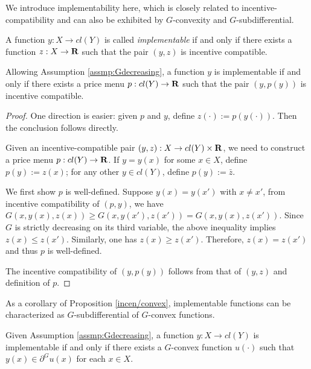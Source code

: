 {We introduce implementability here, which is closely related to incentive-compatibility and can also be exhibited by $G$-convexity and $G$-subdifferential. %
	
\begin{definition}[implementability]
		A function $y: X \rightarrow cl(Y)$ is called \textit{implementable} if and only if there exists a function $z: X \rightarrow {\mathbf R}$  such that the pair $(y, z)$ is incentive compatible.
\end{definition}

\begin{remark}\label{rmk:implementability}
	Allowing Assumption \ref{assmp:Gdecreasing}, a function $y$ is implementable if and only if there exists a price menu $p: cl(Y) \rightarrow {\mathbf R}$ such that the pair $(y, p(y))$ is incentive compatible.
\end{remark}

\begin{proof}%
	One direction is easier: given $p$ and $y$, define $z(\cdot):= p(y(\cdot))$. Then the conclusion follows directly.
	
	Given an incentive-compatible pair $(y, z): X \rightarrow cl(Y) \times {\mathbf R}$, we need to construct a price menu $p: cl(Y)\rightarrow {\mathbf R}$. If $y= y(x)$ for some $x\in X$, define $p(y):= z(x)$; for any other $y \in cl(Y)$, define $p(y) := \bar{z}$. \medskip
	
	We first show $p$ is well-defined. Suppose $y(x) = y(x')$ with $x\ne x'$, from incentive compatibility of $(p,y)$, we have $G(x,y(x), z(x)) \ge G(x, y(x'), z(x')) = G(x, y(x), z(x'))$. Since $G$ is strictly decreasing on its third variable, the above inequality implies $z(x) \le z(x')$. Similarly, one has $z(x) \ge z(x')$. Therefore, $z(x) = z(x')$ and thus $p$ is well-defined.
	
	The incentive compatibility of $(y, p(y))$ follows from that of $(y, z)$ and definition of $p$.
\end{proof}

As a corollary of Proposition \ref{incen/convex},  implementable functions can be characterized as $G$-subdifferential of $G$-convex functions. 


\begin{corollary}\label{cor:implementable}
	Given Assumption \ref{assmp:Gdecreasing}, a function $y: X \rightarrow cl(Y)$ is implementable if and only if there exists a $G$-convex function $u(\cdot)$ such that $y(x) \in \partial^G u(x)$ for each $x\in X$.
\end{corollary}


}
